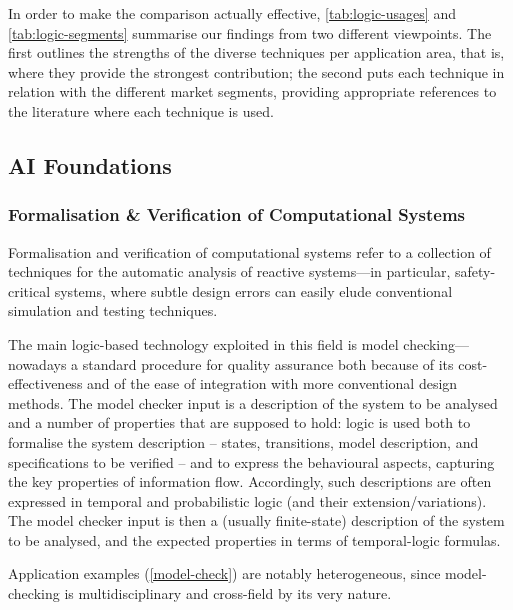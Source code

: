 \documentclass[12pt,a4paper,openright,twoside]{book}
\begin{document}
In order to make the comparison actually effective, \cref{tab:logic-usages} and \cref{tab:logic-segments} summarise our findings from two different viewpoints.
The first outlines the strengths of the diverse techniques per application area, that is, where they provide the strongest contribution; the second puts each technique in relation with the different market segments, providing appropriate references to the literature where each technique is used.



\subsection{AI Foundations}\label{ssec:ai-foundations}

\subsubsection{Formalisation \& Verification of Computational Systems}

Formalisation and verification of computational systems refer to a collection of techniques for the automatic analysis of reactive systems---in particular, safety-critical systems, where subtle design errors can easily elude conventional simulation and testing techniques.

The main logic-based technology exploited in this field is model checking---nowadays a standard procedure for quality assurance both because of its cost-effectiveness and of the ease of integration with more conventional design methods.
%
The model checker input is a description of the system to be analysed and a number of properties that are supposed to hold: logic is used both to formalise the system description -- states, transitions, model description, and specifications to be verified -- and to express the behavioural aspects, capturing the key properties of information flow.
%
Accordingly, such descriptions are often expressed in temporal and probabilistic logic (and their extension/variations).
%
The model checker input is then a (usually finite-state) description of the system to be analysed, and the expected properties in terms of temporal-logic formulas.

Application examples (\cref{model-check}) are notably heterogeneous, since model-checking is multidisciplinary and cross-field by its very nature.
\end{document}
